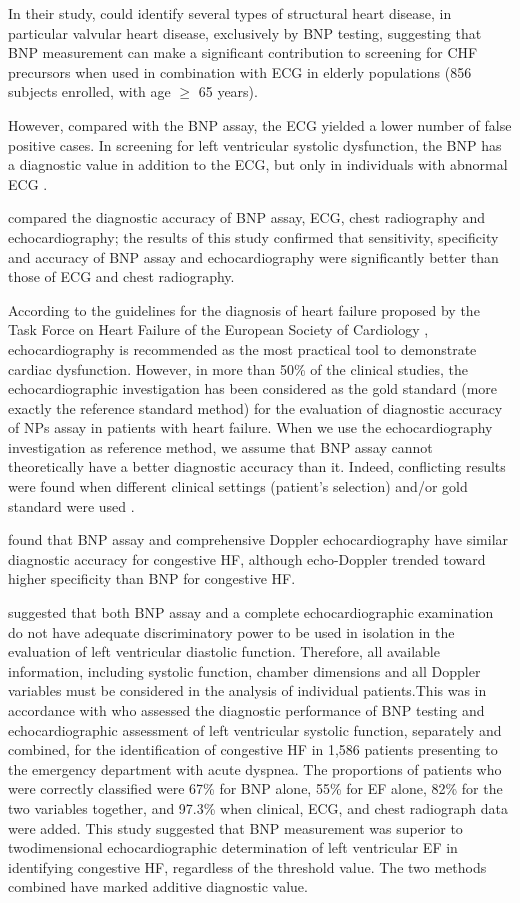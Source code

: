 \documentclass[14pt,a4paper,onecolumn]{extarticle}
\begin{document}
In their study, \citep{bib3174} could identify several types of structural heart disease, in particular valvular heart disease, exclusively by BNP testing, suggesting that BNP measurement can make a significant contribution to screening for CHF precursors when used in combination with ECG in elderly populations (856 subjects enrolled, with age $\geq$ 65 years).

However, compared with the BNP assay, the ECG yielded a lower number of false positive cases. In screening for left ventricular systolic dysfunction, the BNP has a diagnostic value in addition to the ECG, but only in individuals with abnormal ECG \citep{bib3172}.

\citep{bib3170} compared the diagnostic accuracy of BNP assay, ECG, chest radiography and echocardiography; the results of this study confirmed that sensitivity, specificity and accuracy of BNP assay and echocardiography were significantly better than those of ECG and chest radiography.

According to the guidelines for the diagnosis of heart failure proposed by the Task Force on Heart Failure of the European Society of Cardiology \citep{bib369}, echocardiography is recommended as the most practical tool to demonstrate cardiac dysfunction. However, in more than 50\% of the clinical studies, the echocardiographic investigation has been considered as the gold standard (more exactly the reference standard method) for the evaluation of diagnostic accuracy of NPs assay in patients with heart failure.  When we use the echocardiography investigation as reference method, we assume that BNP assay cannot theoretically have a better diagnostic accuracy than it. Indeed, conflicting results were found when different clinical settings (patient’s selection) and/or gold standard were used \citep{bib35} \citep{bib372}.

\citep{bib3178} found that BNP assay and comprehensive Doppler echocardiography have similar diagnostic accuracy for congestive HF, although echo-Doppler trended toward higher specificity than BNP for congestive HF.

\citep{bib3180} suggested that both BNP assay and a complete echocardiographic examination do not have adequate discriminatory power to be used in isolation in the evaluation of left ventricular diastolic function. Therefore, all available information, including systolic function, chamber dimensions and all Doppler variables must be considered in the analysis of individual patients.This was in accordance with \citep{bib3181} who assessed the diagnostic performance of BNP testing and echocardiographic assessment of left ventricular systolic function, separately and combined, for the identification of congestive HF in 1,586 patients presenting to the emergency department with acute dyspnea. The proportions of patients who were correctly classified were 67\% for BNP alone, 55\% for EF alone, 82\% for the two variables together, and 97.3\% when clinical, ECG, and chest radiograph data were added. This study suggested that BNP measurement was superior to twodimensional echocardiographic determination of left ventricular EF in identifying congestive HF, regardless of the threshold value. The two methods combined have marked additive diagnostic value.
\end{document}
